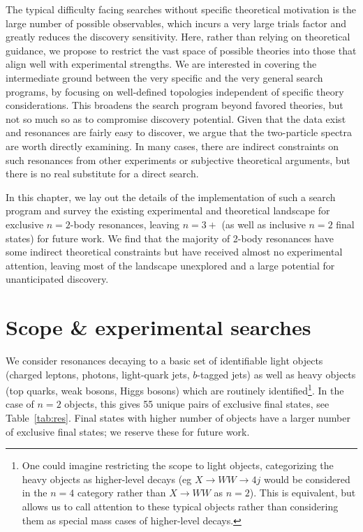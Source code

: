 The typical difficulty facing searches without specific theoretical motivation is the large number of possible observables, which incurs a very large trials factor and greatly reduces the discovery sensitivity.  Here, rather than relying on theoretical guidance, we propose to restrict the vast space of possible theories into those that align well with experimental strengths.    We are interested in covering the intermediate ground between the very specific and the very general search programs, by focusing on well-defined topologies independent of specific theory considerations. This broadens the search program beyond favored theories, but not so much so as to compromise discovery potential.  Given that the data exist and resonances are fairly easy to discover, we argue that the two-particle spectra are worth directly examining. In many cases, there are indirect constraints on such resonances from other experiments or subjective theoretical arguments, but there is no real substitute for a direct search.

In this chapter, we lay out the details of the implementation of such a search program and survey the existing experimental and theoretical landscape for exclusive $n=2$-body resonances, leaving $n=3+$ (as well as inclusive $n=2$ final states) for future work.  We find that the majority of 2-body resonances have some indirect theoretical constraints but have received almost no experimental attention, leaving most of the landscape unexplored and a large potential for unanticipated discovery. 

\section{Scope \& experimental searches}

We consider resonances decaying to a basic set of identifiable light objects (charged leptons, photons, light-quark jets, $b$-tagged jets) as well as heavy objects (top quarks, weak bosons, Higgs bosons) which are routinely identified\footnote{One could imagine restricting the scope to light objects, categorizing the heavy objects as higher-level decays (eg $X\rightarrow WW\rightarrow 4j$ would be considered in the $n=4$ category rather than $X\rightarrow WW$ as $n=2$). This is equivalent, but allows us to call attention to these typical objects rather than considering them as special mass cases of higher-level decays.}. In the case of $n=2$ objects, this gives 55 unique pairs of exclusive final states, see Table~\ref{tab:res}.  Final states with higher number of objects have a larger number of exclusive final states; we reserve these for future work.

